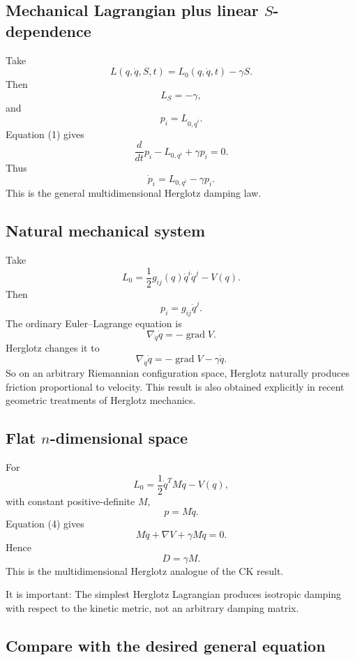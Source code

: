 \subsection{Mechanical Lagrangian plus linear \(S\)-dependence}

Take
\begin{equation}
 \boxed{ L(q,\dot q,S,t) = L_0(q,\dot q,t)-\gamma S. } \tag{3} 
\end{equation}
Then $$ L_S=-\gamma, $$ and $$ p_i=L_{0,\dot q^i}. $$
Equation (1) gives
$$ \frac{d}{dt}p_i-L_{0,q^i} +\gamma p_i=0. $$
Thus
\begin{equation}
\boxed{ \dot p_i = L_{0,q^i} -\gamma p_i. } \tag{4} 
\end{equation}
This is the general multidimensional Herglotz damping law.

\subsection{Natural mechanical system}

Take $$ L_0 = \frac12 g_{ij}(q)\dot q^i\dot q^j - V(q). $$
Then $$ p_i=g_{ij}\dot q^j. $$
The ordinary Euler–Lagrange equation is
$$ \nabla_{\dot q}\dot q = -\operatorname{grad}V. $$
Herglotz changes it to
\begin{equation}
 \boxed{ \nabla_{\dot q}\dot q = -\operatorname{grad}V -\gamma\dot q. } \tag{5} 
\end{equation}
So on an arbitrary Riemannian configuration space, Herglotz naturally produces friction proportional to velocity.
This result is also obtained explicitly in recent geometric treatments of Herglotz mechanics.

\subsection{Flat \(n\)-dimensional space}

For $$ L_0 = \frac12\dot q^TM\dot q-V(q), $$
with constant positive-definite \(M\), $$ p=M\dot q. $$
Equation (4) gives
$$ M\ddot q+\nabla V+\gamma M\dot q=0. $$
Hence
\begin{equation}
 \boxed{ D=\gamma M. } \tag{6} 
\end{equation}
This is the multidimensional Herglotz analogue of the CK result.

It is important:
The simplest Herglotz Lagrangian produces isotropic damping with respect to the kinetic metric, not an arbitrary damping matrix.

\subsection{Compare with the desired general equation}

